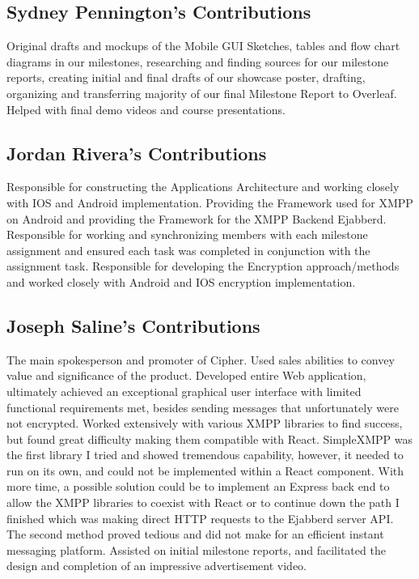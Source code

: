 \documentclass[12pt]{article}
\begin{document}
\subsection{Sydney Pennington's Contributions}
Original drafts and mockups of the Mobile GUI Sketches, tables and flow chart diagrams in our milestones, researching and finding sources for our milestone reports, creating initial and final drafts of our showcase poster, drafting, organizing and transferring majority of our final Milestone Report to Overleaf. Helped with final demo videos and course presentations.  

\subsection{Jordan Rivera's Contributions}
Responsible for constructing the Applications Architecture and working closely with IOS and Android implementation. Providing the Framework used for XMPP on Android and providing the Framework for the XMPP Backend Ejabberd. Responsible for working and synchronizing members with each milestone assignment and ensured each task was completed in conjunction with the assignment task. Responsible for developing the Encryption approach/methods and worked closely with Android and IOS encryption implementation.  
\subsection{Joseph Saline's Contributions}
The main spokesperson and promoter of Cipher. Used sales abilities to convey value and significance of the product. Developed entire Web application, ultimately achieved an exceptional graphical user interface with limited functional requirements met, besides sending messages that unfortunately were not encrypted. Worked extensively with various XMPP libraries to find success, but found great difficulty making them compatible with React. SimpleXMPP was the first library I tried and showed tremendous capability, however, it needed to run on its own, and could not be implemented within a React component. With more time, a possible solution could be to implement an Express back end to allow the XMPP libraries to coexist with React or to continue down the path I finished which was making direct HTTP requests to the Ejabberd server API. The second method proved tedious and did not make for an efficient instant messaging platform. Assisted on initial milestone reports, and facilitated the design and completion of an impressive advertisement video.
\end{document}
